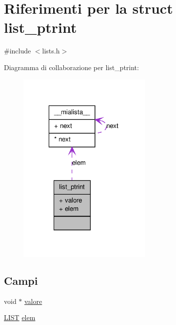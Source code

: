 \hypertarget{structlist__ptrint}{
\section{Riferimenti per la struct list\_\-ptrint}
\label{structlist__ptrint}
}


{\ttfamily \#include $<$lists.h$>$}



Diagramma di collaborazione per list\_\-ptrint:
\nopagebreak
\begin{figure}[H]
\begin{center}
\leavevmode
\includegraphics[width=187pt]{structlist__ptrint__coll__graph}
\end{center}
\end{figure}
\subsection*{Campi}
\begin{DoxyCompactItemize}
\item 
void $\ast$ \hyperlink{structlist__ptrint_a5c56a717f43a7ef15972bfd77dc644b4}{valore}
\item 
\hyperlink{struct____mialista____}{LIST} \hyperlink{structlist__ptrint_a39c87bcd548089f52d94807b0e5771ac}{elem}
\end{DoxyCompactItemize}


